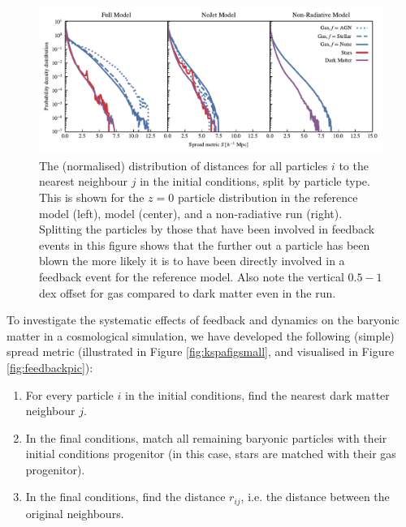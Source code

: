 \begin{figure}
    \centering
    \includegraphics[width=\textwidth]{figures/neighbour_analysis_feedback_histogram_combined.pdf}
    \vspace{-0.7cm}
    \caption{
        The (normalised) distribution of distances for all particles $i$ to
        the nearest neighbour $j$ in the initial conditions, split by particle
        type. This is shown for the $z=0$ particle distribution in the
        reference model (left), \nojet{} model (center), and a non-radiative
        run (right). Splitting the particles by those that have been
        involved in feedback events in this figure shows that the further
        out a particle has been blown the more likely it is to have been
        directly involved in a feedback event for the reference model. Also note
        the vertical $0.5-1$ dex offset for gas compared to dark matter even in
        the \nojet{} run. 
    }\label{fig:feedbackdistance}
\end{figure}


To investigate the systematic effects of feedback and dynamics on the baryonic
matter in a cosmological simulation, we have developed the following (simple)
spread metric (illustrated in Figure \ref{fig:kspafigsmall}, and visualised in Figure \ref{fig:feedbackpic}):

\begin{enumerate}
	\item For every particle $i$ in the initial conditions, find the nearest
              dark matter neighbour $j$.
	\item In the final conditions, match all remaining baryonic particles
	      with their initial conditions progenitor (in this case, stars are
	      matched with their gas progenitor).
	\item In the final conditions, find the distance $r_{ij}$, i.e. the
	      distance between the original neighbours.
\end{enumerate}

